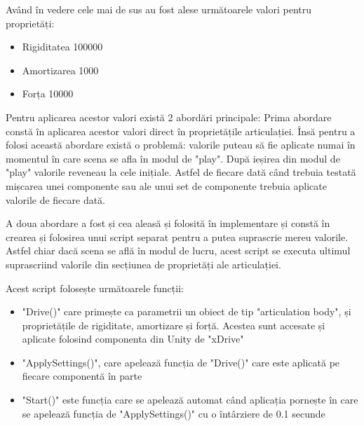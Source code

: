 Având în vedere cele mai de sus au fost alese următoarele valori pentru proprietăți:
\begin{itemize}
	\item Rigiditatea 100000
	\item Amortizarea 1000
	\item Forța 10000
\end{itemize}

Pentru aplicarea acestor valori există 2 abordări principale:
Prima abordare constă în aplicarea  acestor valori direct în proprietățile articulației. Însă pentru a folosi această abordare există o problemă: valorile puteau să fie aplicate numai în momentul în care scena se afla în modul de "play". După ieșirea  din modul de "play" valorile reveneau la cele inițiale. Astfel de fiecare dată când trebuia testată mișcarea unei componente sau ale unui set de componente trebuia aplicate valorile de fiecare dată.

A doua abordare a fost și cea aleasă și folosită în implementare și constă în crearea  și folosirea unui script separat pentru a putea suprascrie mereu valorile. Astfel chiar dacă scena se află în modul de lucru, acest script se executa ultimul suprascriind valorile din secțiunea de proprietăți ale articulației. 

Acest script folosește următoarele funcții:
\begin{itemize}
	\item "Drive()" care primește ca parametrii un obiect de tip "articulation body", și proprietățile de rigiditate, amortizare și forță. Acestea sunt accesate și aplicate folosind componenta din Unity de "xDrive"
	\item "ApplySettings()", care apelează funcția de "Drive()" care este aplicată pe fiecare componentă în parte
	\item "Start()" este funcția care se apelează automat când aplicația pornește în care se apelează funcția de "ApplySettings()" cu o întârziere de 0.1 secunde
\end{itemize}




